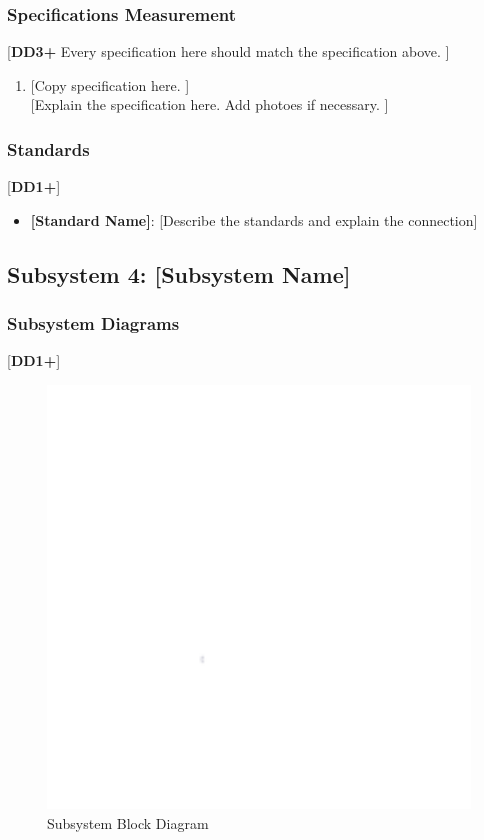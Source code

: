 \documentclass[letterpaper, 11pt]{article}
\begin{document}
\subsubsection{Specifications Measurement}
[\textbf{DD3+} Every specification here should match the specification above. ]
\begin{enumerate}
    \item {[Copy specification here. ]} \\
          {[Explain the specification here. Add photoes if necessary. ]}
\end{enumerate}

\subsubsection{Standards}
[\textbf{DD1+}]
\begin{itemize}
    \item \textbf{[Standard Name]}: [Describe the standards and explain the connection]
\end{itemize}

\clearpage
\subsection{Subsystem 4: [Subsystem Name]}

\subsubsection{Subsystem Diagrams}
[\textbf{DD1+}]
\begin{figure}[h]
    \centering
    \includegraphics[width=16cm]{white.png} %
    \caption{Subsystem Block Diagram}
\end{figure} %
\end{document}
